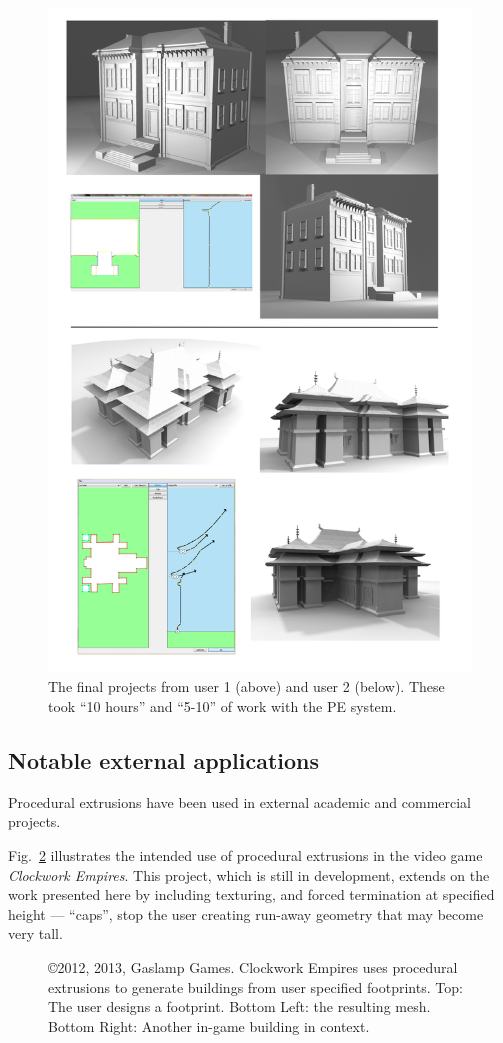 \begin{figure}
  \centering
  \includegraphics[width=0.7\columnwidth]{chase_galen.png}
  \caption[Further artistic use of PEs]{\label{fig:chase_galen} The final projects from user 1 (above) and user 2 (below). These took ``10 hours'' and ``5-10'' of work with the PE system.}
\end{figure}

\FloatBarrier
\subsection{Notable external applications}

Procedural extrusions have been used in external academic and commercial projects.

 Fig.~\ref{fig:clockwork_empires} illustrates the intended use of procedural extrusions in the video game \emph{Clockwork Empires}\cite{clockworkEmpires}. This project, which is still in development, extends on the work presented here by including texturing, and forced termination at specified height --- ``caps'', stop the user creating run-away geometry that may become very tall.

\begin{figure}
  \centering
  \def\svgwidth{1.0\columnwidth}
  
  \caption[Clockwork Empires video game.]{\label{fig:clockwork_empires}\copyright 2012, 2013, Gaslamp Games. Clockwork Empires\cite{clockworkEmpires} uses procedural extrusions to generate buildings from user specified footprints. Top: The user designs a footprint. Bottom Left: the resulting mesh. Bottom Right: Another in-game building in context.}
\end{figure}

